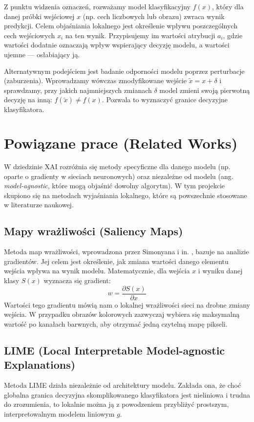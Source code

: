 \documentclass[10pt,journal,compsoc]{IEEEtran}
\begin{document}
Z punktu widzenia oznaczeń, rozważamy model klasyfikacyjny $f(x)$, który dla danej próbki wejściowej $x$ (np. cech liczbowych lub obrazu) zwraca wynik predykcji. Celem objaśniania lokalnego jest określenie wpływu poszczególnych cech wejściowych $x_i$ na ten wynik. Przypisujemy im wartości atrybucji $a_i$, gdzie wartości dodatnie oznaczają wpływ wspierający decyzję modelu, a wartości ujemne — osłabiający ją. 

Alternatywnym podejściem jest badanie odporności modelu poprzez perturbacje (zaburzenia). Wprowadzamy wówczas zmodyfikowane wejście $\tilde{x} = x + \delta$ i sprawdzamy, przy jakich najmniejszych zmianach $\delta$ model zmieni swoją pierwotną decyzję na inną: $f(\tilde{x}) \neq f(x)$. Pozwala to wyznaczyć granice decyzyjne klasyfikatora.


\section{Powiązane prace (Related Works)}
W dziedzinie XAI rozróżnia się metody specyficzne dla danego modelu (np. oparte o gradienty w sieciach neuronowych) oraz niezależne od modelu (ang. \textit{model-agnostic}, które mogą objaśnić dowolny algorytm). W tym projekcie skupiono się na metodach wyjaśniania lokalnego, które są powszechnie stosowane w literaturze naukowej.

\subsection{Mapy wrażliwości (Saliency Maps)}
Metoda map wrażliwości, wprowadzona przez Simonyana i in. \cite{Simonyan2013}, bazuje na analizie gradientów. Jej celem jest określenie, jak zmiana wartości danego elementu wejścia wpływa na wynik modelu. Matematycznie, dla wejścia $x$ i wyniku danej klasy $S(x)$ wyznacza się gradient:
\begin{equation}
w = \frac{\partial S(x)}{\partial x}
\end{equation}
Wartości tego gradientu mówią nam o lokalnej wrażliwości sieci na drobne zmiany wejścia. W przypadku obrazów kolorowych zazwyczaj wybiera się maksymalną wartość po kanałach barwnych, aby otrzymać jedną czytelną mapę pikseli.

\subsection{LIME (Local Interpretable Model-agnostic Explanations)}
Metoda LIME \cite{Ribeiro2016} działa niezależnie od architektury modelu. Zakłada ona, że choć globalna granica decyzyjna skomplikowanego klasyfikatora jest nieliniowa i trudna do zrozumienia, to lokalnie można ją z powodzeniem przybliżyć prostszym, interpretowalnym modelem liniowym $g$.
\end{document}
